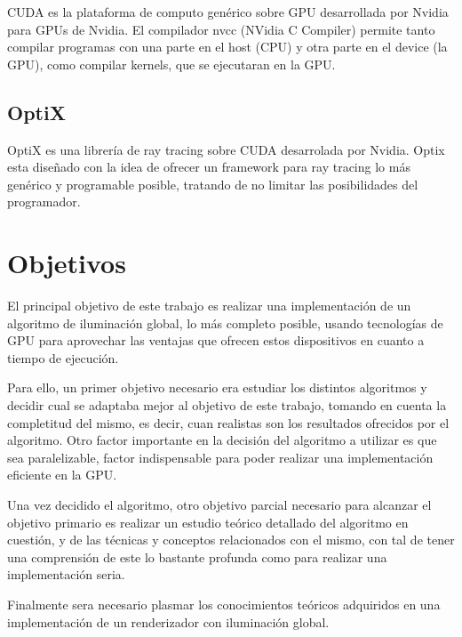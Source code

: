 CUDA es la plataforma de computo genérico sobre GPU desarrollada por Nvidia para GPUs de Nvidia. El compilador nvcc (NVidia C Compiler) permite tanto compilar programas con una parte en el host (CPU) y otra parte en el device (la GPU), como compilar kernels, que se ejecutaran en la GPU.

\subsection{OptiX}

OptiX es una librería de ray tracing sobre CUDA desarrolada por Nvidia. Optix esta diseñado con la idea de ofrecer un framework para ray tracing lo más genérico y programable posible, tratando de no limitar las posibilidades del programador.

\clearpage

\section{Objetivos}

El principal objetivo de este trabajo es realizar una implementación de un algoritmo de iluminación global, lo más completo posible, usando tecnologías de GPU para aprovechar las ventajas que ofrecen estos dispositivos en cuanto a tiempo de ejecución.

\medskip

Para ello, un primer objetivo necesario era estudiar los distintos algoritmos y decidir cual se adaptaba mejor al objetivo de este trabajo, tomando en cuenta la completitud del mismo, es decir, cuan realistas son los resultados ofrecidos por el algoritmo. Otro factor importante en la decisión del algoritmo a utilizar es que sea paralelizable, factor indispensable para poder realizar una implementación eficiente en la GPU.

\medskip

Una vez decidido el algoritmo, otro objetivo parcial necesario para alcanzar el objetivo primario es realizar un estudio teórico detallado del algoritmo en cuestión, y de las técnicas y conceptos relacionados con el mismo, con tal de tener una comprensión de este lo bastante profunda como para realizar una implementación seria.

\medskip

Finalmente sera necesario plasmar los conocimientos teóricos adquiridos en una implementación de un renderizador con iluminación global. 




